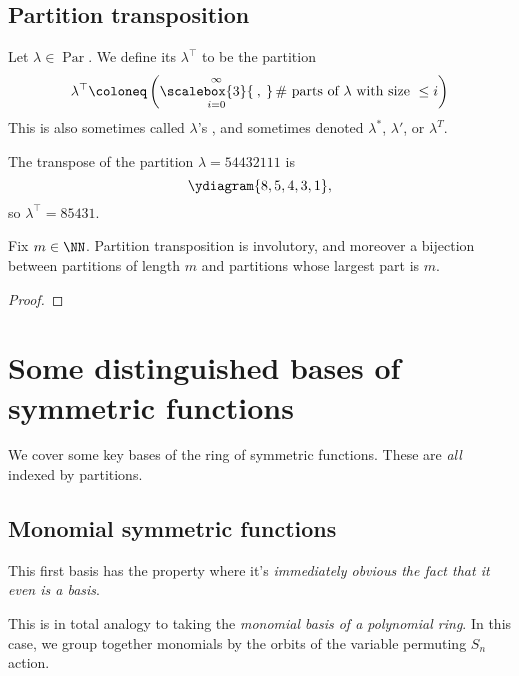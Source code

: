 \documentclass{article}
\newcommand{\bigcomma}{\ensuremath{\mathop{\scalebox{3}{\:,\:}}\limits}}
\DeclareMathOperator{\Par}{Par}
\begin{document}
\subsection{Partition transposition}

\begin{definition}
    Let $\lambda \in \Par$.
    We define its  $\lambda^\top$ to be the partition
    \[
        \lambda^\top
        \coloneq
        \left(
            \bigcomma_{i=0}^\infty
            \# \text{ parts of }\lambda\text{ with size }\leq i
        \right)
    \]
    This is also sometimes called $\lambda$'s , and sometimes denoted $\lambda^\ast$, $\lambda'$, or $\lambda^T$.
\end{definition}

\begin{example}
    The transpose of the partition $\lambda = 54432111$ is
    \[
        \ydiagram{8,5,4,3,1},
    \]
    so $\lambda^\top = 85431$.
\end{example}

\begin{proposition}
    Fix $m \in \NN$.
    Partition transposition is involutory, and moreover a bijection between partitions of length $m$ and partitions whose largest part is $m$.
\end{proposition}

\begin{proof}
\end{proof}

\section{Some distinguished bases of symmetric functions}

We cover some key bases of the ring of symmetric functions. These are \textit{all} indexed by partitions.

\subsection{Monomial symmetric functions}

This first basis has the property where it's \textit{immediately obvious the fact that it even is a basis}.

This is in total analogy to taking the \textit{monomial basis of a polynomial ring}. In this case, we group together monomials by the orbits of the variable permuting $S_n$ action.
\end{document}
